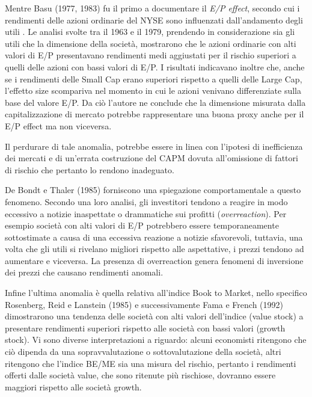 Mentre Basu (1977, 1983) fu il primo a documentare il \textit{E/P effect},  secondo cui i rendimenti delle azioni ordinarie del NYSE sono influenzati dall'andamento degli utili \cite{basu_investment_1977} \cite{basu_relationship_1983}. Le analisi svolte tra il 1963 e il 1979, prendendo in considerazione sia gli utili che la dimensione della società, mostrarono che le azioni ordinarie con alti valori di E/P presentavano rendimenti medi aggiustati per il rischio superiori a quelli delle azioni con bassi valori di E/P. I risultati indicavano inoltre che, anche se i rendimenti delle Small Cap erano superiori rispetto a quelli delle Large Cap, l'effetto size scompariva nel momento in cui le azioni venivano differenziate sulla base del valore E/P. Da ciò l'autore ne conclude che la dimensione misurata dalla capitalizzazione di mercato potrebbe rappresentare una buona proxy anche per il E/P effect ma non viceversa. 

Il perdurare di tale anomalia, potrebbe essere in linea con l'ipotesi di inefficienza dei mercati e di un'errata costruzione del CAPM dovuta all'omissione di fattori di rischio che pertanto lo rendono inadeguato.

De Bondt e Thaler (1985) \cite{de_bondt_does_1985} forniscono una spiegazione comportamentale a questo fenomeno. Secondo una loro analisi, gli investitori tendono a reagire in modo eccessivo a notizie inaspettate o drammatiche sui profitti (\textit{overreaction}). Per esempio società con alti valori di E/P potrebbero essere temporaneamente sottostimate a causa di una eccessiva reazione a notizie sfavorevoli, tuttavia, una volta che gli utili si rivelano migliori rispetto alle aspettative, i prezzi tendono ad aumentare e viceversa. La presenza di overreaction genera fenomeni di inversione dei prezzi che causano rendimenti anomali. 

Infine l'ultima anomalia è quella relativa all'indice Book to Market, nello specifico Rosenberg, Reid  e Lanstein  (1985) e successivamente Fama e French (1992) dimostrarono una tendenza delle società con alti valori dell'indice (value stock) a presentare rendimenti superiori rispetto alle società con bassi valori (growth stock). Vi sono diverse interpretazioni a riguardo: alcuni economisti ritengono che ciò dipenda da una sopravvalutazione o sottovalutazione della società, altri ritengono che l'indice BE/ME sia una misura del rischio, pertanto i rendimenti offerti dalle società value, che sono ritenute più rischiose, dovranno essere maggiori rispetto alle società growth.


